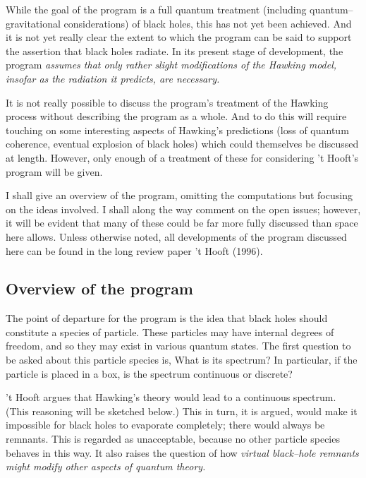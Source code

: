 While the goal of the
program is a full quantum treatment (including quantum--gravitational
considerations) of black holes, this has not yet been achieved.  And it
is not yet really clear the extent to which the program can be said to 
support the assertion that black holes radiate.
In its present stage of development, the 
program \it assumes \rm that only rather slight modifications of the 
Hawking model, insofar as the radiation it predicts, are necessary. 

It is not really possible to discuss the program's treatment of the
Hawking process without describing the program as a whole.
And to do this will require touching on some interesting aspects of
Hawking's predictions (loss of quantum coherence, eventual explosion
of black holes) which could themselves be discussed at length.
However, only enough of a treatment of these for considering 't Hooft's
program will be given.

I shall give an overview of the program, omitting the computations but
focusing on the ideas involved.  I shall along the way comment on the 
open issues; however, it will be evident that
many of these could be far more fully discussed 
than space here allows.  
Unless otherwise noted, all developments of the program
discussed here can be found in the long review paper 't Hooft (1996).

\subsection{Overview of the program}

The point of departure for the program is the idea
that black holes should
constitute a species of particle.  These particles may have internal
degrees of freedom, and so they may exist in various quantum states.  
The first question to be asked about this particle species is, What is
its spectrum?  In particular, if the particle is placed in a box, is
the spectrum continuous or discrete?

't Hooft argues that Hawking's theory would lead to a continuous
spectrum.  (This reasoning will be sketched below.)
This in turn, it is argued, would make it impossible for
black holes to evaporate completely; there would always be remnants.
This is regarded as unacceptable, because no other particle species
behaves in this way.  It also raises the question of how \it virtual
\rm black--hole remnants might modify other aspects of quantum theory.

